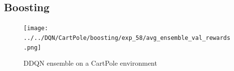 \documentclass[11pt,a4paper]{article}
\begin{document}
	\subsection{Boosting} \label{subsec:boosting}
	\begin{figure}
		\label{fig:dqn_cartpole_boosting}
		\centering
		\texttt{[image: ../../DQN/CartPole/boosting/exp\_58/avg\_ensemble\_val\_rewards.png]}
		\caption{DDQN ensemble on a CartPole environment}
	\end{figure}

	

	

	
	
\end{document}
